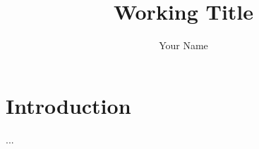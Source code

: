 \documentclass{article}
\begin{document}
\title{Working Title}
\author{Your Name}
\maketitle

\section{Introduction}

...



\end{document}
